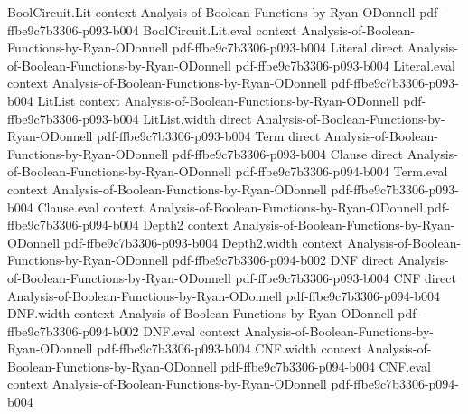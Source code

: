 \begin{lemma}
\label{DecisionTree.coeffs_granular}
\leanok
{}
\proofstep
  {BoolCircuit.Lit}
  {context}
  {Analysis-of-Boolean-Functions-by-Ryan-ODonnell}
  {pdf-ffbe9c7b3306-p093-b004}
\proofstep
  {BoolCircuit.Lit.eval}
  {context}
  {Analysis-of-Boolean-Functions-by-Ryan-ODonnell}
  {pdf-ffbe9c7b3306-p093-b004}
\proofstep
  {Literal}
  {direct}
  {Analysis-of-Boolean-Functions-by-Ryan-ODonnell}
  {pdf-ffbe9c7b3306-p093-b004}
\proofstep
  {Literal.eval}
  {context}
  {Analysis-of-Boolean-Functions-by-Ryan-ODonnell}
  {pdf-ffbe9c7b3306-p093-b004}
\proofstep
  {LitList}
  {context}
  {Analysis-of-Boolean-Functions-by-Ryan-ODonnell}
  {pdf-ffbe9c7b3306-p093-b004}
\proofstep
  {LitList.width}
  {direct}
  {Analysis-of-Boolean-Functions-by-Ryan-ODonnell}
  {pdf-ffbe9c7b3306-p093-b004}
\proofstep
  {Term}
  {direct}
  {Analysis-of-Boolean-Functions-by-Ryan-ODonnell}
  {pdf-ffbe9c7b3306-p093-b004}
\proofstep
  {Clause}
  {direct}
  {Analysis-of-Boolean-Functions-by-Ryan-ODonnell}
  {pdf-ffbe9c7b3306-p094-b004}
\proofstep
  {Term.eval}
  {context}
  {Analysis-of-Boolean-Functions-by-Ryan-ODonnell}
  {pdf-ffbe9c7b3306-p093-b004}
\proofstep
  {Clause.eval}
  {context}
  {Analysis-of-Boolean-Functions-by-Ryan-ODonnell}
  {pdf-ffbe9c7b3306-p094-b004}
\proofstep
  {Depth2}
  {context}
  {Analysis-of-Boolean-Functions-by-Ryan-ODonnell}
  {pdf-ffbe9c7b3306-p093-b004}
\proofstep
  {Depth2.width}
  {context}
  {Analysis-of-Boolean-Functions-by-Ryan-ODonnell}
  {pdf-ffbe9c7b3306-p094-b002}
\proofstep
  {DNF}
  {direct}
  {Analysis-of-Boolean-Functions-by-Ryan-ODonnell}
  {pdf-ffbe9c7b3306-p093-b004}
\proofstep
  {CNF}
  {direct}
  {Analysis-of-Boolean-Functions-by-Ryan-ODonnell}
  {pdf-ffbe9c7b3306-p094-b004}
\proofstep
  {DNF.width}
  {context}
  {Analysis-of-Boolean-Functions-by-Ryan-ODonnell}
  {pdf-ffbe9c7b3306-p094-b002}
\proofstep
  {DNF.eval}
  {context}
  {Analysis-of-Boolean-Functions-by-Ryan-ODonnell}
  {pdf-ffbe9c7b3306-p093-b004}
\proofstep
  {CNF.width}
  {context}
  {Analysis-of-Boolean-Functions-by-Ryan-ODonnell}
  {pdf-ffbe9c7b3306-p094-b004}
\proofstep
  {CNF.eval}
  {context}
  {Analysis-of-Boolean-Functions-by-Ryan-ODonnell}
  {pdf-ffbe9c7b3306-p094-b004}

\end{lemma}
